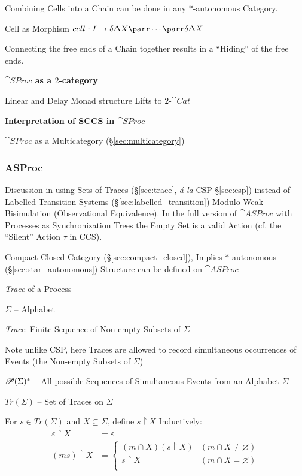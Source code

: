 Combining Cells into a Chain can be done in any $*$-autonomous
Category.

Cell as Morphism $cell : I \rightarrow \delta\Delta X \parr \cdots
\parr \delta\Delta X$

Connecting the free ends of a Chain together results in a ``Hiding''
of the free ends.



\textbf{$\cat{SProc}$ as a $2$-category}

Linear and Delay Monad structure Lifts to $2$-$\cat{Cat}$



\textbf{Interpretation of SCCS in $\cat{SProc}$}

$\cat{SProc}$ as a Multicategory (\S\ref{sec:multicategory})



\subsubsection{ASProc}\label{sec:asproc}

\cite{abramsky-gay-nagarajan96}

\fist Discussion in \cite{abramsky-gay-nagarajan96} using Sets of
Traces (\S\ref{sec:trace}, \emph{\'a la} CSP \S\ref{sec:csp}) instead
of Labelled Transition Systems (\S\ref{sec:labelled_transition})
Modulo Weak Bisimulation (Observational Equivalence). In the full
version of $\cat{ASProc}$ with Processes as Synchronization Trees the
Empty Set is a valid Action (cf. the ``Silent'' Action $\tau$ in CCS).

Compact Closed Category (\S\ref{sec:compact_closed}), Implies
$*$-autonomous (\S\ref{sec:star_autonomous}) Structure can be defined
on $\cat{ASProc}$

\emph{Trace} of a Process

$\Sigma$ -- Alphabet

\emph{Trace}: Finite Sequence of Non-empty Subsets of $\Sigma$

\fist Note unlike CSP, here Traces are allowed to record
simultaneous occurrences of Events (the Non-empty Subsets of $\Sigma$)

\interrobang $\mathscr{P}(\Sigma)^*$ -- All possible Sequences of
Simultaneous Events from an Alphabet $\Sigma$

$Tr(\Sigma)$ -- Set of Traces on $\Sigma$

For $s \in Tr(\Sigma)$ and $X \subseteq \Sigma$, define $s
\upharpoonright X$ Inductively:
\begin{align*}
  \varepsilon \upharpoonright X &= \varepsilon \\
  (ms) \upharpoonright X &=
    \begin{cases}
      (m \cap X)(s \upharpoonright X) & (m \cap X \neq \varnothing) \\
      s \upharpoonright X & (m \cap X = \varnothing) \\
    \end{cases}
\end{align*}

